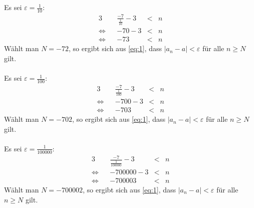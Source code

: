 \documentclass[10pt,a4paper,oneside,ngerman,numbers=noenddot]{scrartcl}
\begin{document}
\subsection{} %
Es sei $\varepsilon = \frac{1}{10}$:\\
\begin{alignat*}{3}
&& \frac{-7}{\frac{1}{10}} - 3 &<& n \\
\Leftrightarrow && -70 - 3 &<& n \\
\Leftrightarrow && -73 &<& n
\end{alignat*}
Wählt man $N = -72$, so ergibt sich aus \eqref{eq:1}, dass $|a_{n} - a| < \varepsilon$ für alle $n \geq N$ gilt.\\
\\
Es sei $\varepsilon = \frac{1}{100}$:\\
\begin{alignat*}{3}
&& \frac{-7}{\frac{1}{100}} - 3 &<& n \\
\Leftrightarrow && -700 - 3 &<& n \\
\Leftrightarrow && -703 &<& n
\end{alignat*}
Wählt man $N = -702$, so ergibt sich aus \eqref{eq:1}, dass $|a_{n} - a| < \varepsilon$ für alle $n \geq N$ gilt.\\
\\
Es sei $\varepsilon = \frac{1}{100000}$:\\
\begin{alignat*}{3}
&& \frac{-7}{\frac{1}{100000}} - 3 &<& n \\
\Leftrightarrow && -700000 - 3 &<& n \\
\Leftrightarrow && -700003 &<& n
\end{alignat*}
Wählt man $N = -700002$, so ergibt sich aus \eqref{eq:1}, dass $|a_{n} - a| < \varepsilon$ für alle $n \geq N$ gilt.
\end{document}
